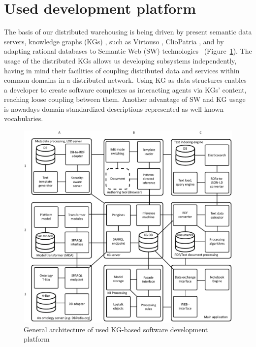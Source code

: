 \documentclass[
]{aiitart}
\begin{document}
\section{Used development platform}

The basis of our distributed warehousing is being driven by present semantic data servers, knowledge graphs (KGs) \cite{kg}, such as Virtouso \cite{virtuoso}, ClioPatria \cite{b8}, and by adapting rational databases to Semantic Web (SW) technologies~\cite{tbl} (Figure~\ref{fig:arch}).  The usage of the distributed KGs allows us developing subsystems independently, having in mind their facilities of coupling distributed data and services within common domains in a distributed network.  Using KG as data structures enables a developer to create software complexes as interacting agents via KGs' content, reaching loose coupling between them.  Another advantage of SW and KG usage is nowadays domain standardized descriptions represented as well-known vocabularies.

\begin{figure}
\centering
\includegraphics[width=1\linewidth]{architecture-mda-lod-ext-general.pdf}
\caption{General architecture of used KG-based software development platform}
\label{fig:arch}
\end{figure}
\end{document}
